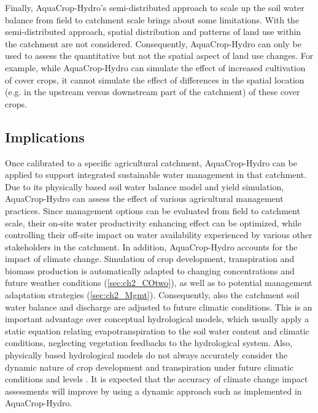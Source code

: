 Finally, AquaCrop-Hydro's semi-distributed approach to scale up the soil water balance from field to catchment scale brings about some limitations. With the semi-distributed approach, spatial distribution and patterns of land use within the catchment are not considered. Consequently, AquaCrop-Hydro can only be used to assess the quantitative but not the spatial aspect of land use changes. For example, while AquaCrop-Hydro can simulate the effect of increased cultivation of cover crops, it cannot simulate the effect of differences in the spatial location (e.g. in the upstream versus downstream part of the catchment) of these cover crops.

\subsection{Implications}
Once calibrated to a specific agricultural catchment, AquaCrop-Hydro can be applied to support integrated sustainable water management in that catchment. Due to its physically based soil water balance model and yield simulation, AquaCrop-Hydro can assess the effect of various agricultural management practices. Since management options can be evaluated from field to catchment scale, their on-site water productivity enhancing effect can be optimized, while controlling their off-site impact on water availability experienced by various other stakeholders in the catchment.  In addition, AquaCrop-Hydro accounts for the impact of climate change. Simulation of crop development, transpiration and biomass production is automatically adapted to changing \COtwo concentrations and future weather conditions (\autoref{sec:ch2_COtwo}), as well as to potential management adaptation strategies (\autoref{sec:ch2_Mgmt}). Consequently, also the catchment soil water balance and discharge are adjusted to future climatic conditions. This is an important advantage over conceptual hydrological models, which usually apply a static equation relating evapotranspiration to the soil water content and climatic conditions, neglecting vegetation feedbacks to the hydrological system. Also, physically based hydrological models do not always accurately consider the dynamic nature of crop development and transpiration under future climatic conditions and \COtwo levels \parencite{gassman2007, vanwalsum2012}. It is expected that the accuracy of climate change impact assessments will improve by using a dynamic approach such as implemented in AquaCrop-Hydro.

